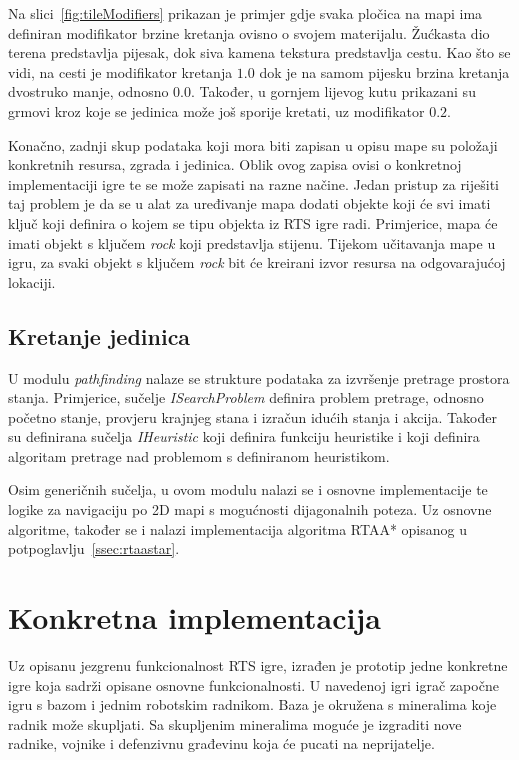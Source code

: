 \documentclass[times, utf8, zavrsni, numeric]{fer}
\begin{document}
\par Na slici~\ref{fig:tileModifiers} prikazan je primjer gdje svaka pločica na mapi ima definiran modifikator brzine kretanja ovisno o svojem materijalu.
Žućkasta dio terena predstavlja pijesak, dok siva kamena tekstura predstavlja cestu.
Kao što se vidi, na cesti je modifikator kretanja \(1.0\) dok je na samom pijesku brzina kretanja dvostruko manje, odnosno \(0.0\).
Također, u gornjem lijevog kutu prikazani su grmovi kroz koje se jedinica može još sporije kretati, uz modifikator \(0.2\).

\par Konačno, zadnji skup podataka koji mora biti zapisan u opisu mape su položaji konkretnih resursa, zgrada i jedinica.
Oblik ovog zapisa ovisi o konkretnoj implementaciji igre te se može zapisati na razne načine.
Jedan pristup za riješiti taj problem je da se u alat za uređivanje mapa dodati objekte koji će svi imati ključ koji definira o kojem se tipu objekta  iz RTS igre radi.
Primjerice, mapa će imati objekt s ključem \textit{rock} koji predstavlja stijenu.
Tijekom učitavanja mape u igru, za svaki objekt s ključem \textit{rock} bit će kreirani izvor resursa na odgovarajućoj lokaciji.

\subsection{Kretanje jedinica}

\par U modulu \textit{pathfinding} nalaze se strukture podataka za izvršenje pretrage prostora stanja.
Primjerice, sučelje \textit{ISearchProblem} definira problem pretrage, odnosno početno stanje, provjeru krajnjeg stana i izračun idućih stanja i akcija. 
Također su definirana sučelja \textit{IHeuristic} koji definira funkciju heuristike i  koji definira algoritam pretrage nad problemom s definiranom heuristikom.

\par Osim generičnih sučelja, u ovom modulu nalazi se i osnovne implementacije te logike za navigaciju po 2D mapi s mogućnosti dijagonalnih poteza.
Uz osnovne algoritme, također se i nalazi implementacija algoritma RTAA* opisanog u potpoglavlju~\ref{ssec:rtaastar}.

\section{Konkretna implementacija}

\par Uz opisanu jezgrenu funkcionalnost RTS igre, izrađen je prototip jedne konkretne igre koja sadrži opisane osnovne funkcionalnosti.
U navedenoj igri igrač započne igru s bazom i jednim robotskim radnikom.
Baza je okružena s mineralima koje radnik može skupljati.
Sa skupljenim mineralima moguće je izgraditi nove radnike, vojnike i defenzivnu građevinu koja će pucati na neprijatelje.
\end{document}
